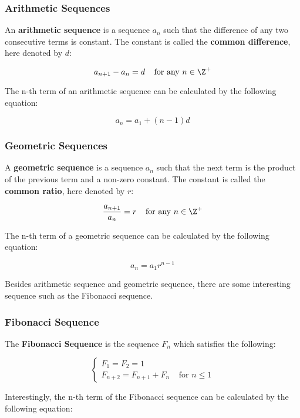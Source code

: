 \subsubsection{Arithmetic Sequences}
\begin{dft}
  An \textbf{arithmetic sequence} is a sequence $a_{n}$ such that the difference of any two consecutive terms is constant. The constant is called the \textbf{common difference}, here denoted by $d$:

  $$a_{n+1}-a_{n}=d\;\;\;\;\text{for any }n\in \Z^{+}$$
\end{dft}\n

The n-th term of an arithmetic sequence can be calculated by the following equation:

$$a_{n}=a_{1}+(n-1)d$$

\subsubsection{Geometric Sequences}
\begin{dft}
  A \textbf{geometric sequence} is a sequence $a_{n}$ such that the next term is the product of the previous term and a non-zero constant. The constant is called the \textbf{common ratio}, here denoted by $r$:

  $$\frac{a_{n+1}}{a_{n}}=r\;\;\;\;\text{for any }n\in \Z^{+}$$
\end{dft}\n

The n-th term of a geometric sequence can be calculated by the following equation:

$$a_{n}=a_{1}r^{n-1}$$\s

Besides arithmetic sequence and geometric sequence, there are some interesting sequence such as the Fibonacci sequence.

\subsubsection{Fibonacci Sequence}
\begin{dft}
  The \textbf{Fibonacci Sequence} is the sequence $F_{n}$ which satisfies the following:

  $$\left\{\begin{matrix}
    F_{1}=F_{2}=1 \\
    F_{n+2}=F_{n+1}+F_{n}\;\;\;\;\text{for }n\leq 1
  \end{matrix}\right.$$
\end{dft}\n

Interestingly, the n-th term of the Fibonacci sequence can be calculated by the following equation:

